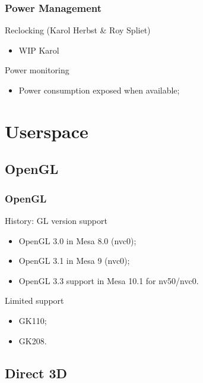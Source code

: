 \documentclass[11pt,english,compress]{beamer}
\begin{document}
\begin{frame}
	\frametitle{Power Management}

	\begin{block}{Reclocking (Karol Herbst \& Roy Spliet)}
		\begin{itemize}
			\item WIP Karol
		\end{itemize}
	\end{block}

	\begin{block}{Power monitoring}
		\begin{itemize}
			\item Power consumption exposed when available;
		\end{itemize}
	\end{block}
\end{frame}

\section{Userspace}
\subsection{OpenGL}

\begin{frame}
	\frametitle{OpenGL}


	\begin{block}{History: GL version support}
		\begin{itemize}
			\item OpenGL 3.0 in Mesa 8.0 (nvc0);
			\item OpenGL 3.1 in Mesa 9 (nvc0);
			\item OpenGL 3.3 support in Mesa 10.1 for nv50/nvc0.
		\end{itemize}
	\end{block}

	\begin{block}{Limited support}
		\begin{itemize}
			\item GK110;
			\item GK208.
		\end{itemize}
	\end{block}
\end{frame}

\subsection{Direct 3D}
\end{document}
